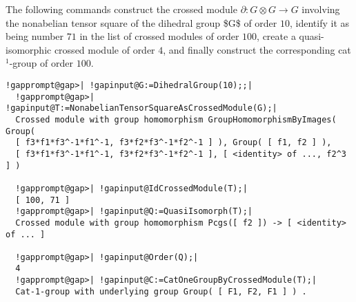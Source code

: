 \documentclass[a4paper,11pt]{report}
\begin{document}
{{The following commands construct the crossed module $\partial \colon G\otimes G \rightarrow G$ involving the nonabelian tensor square of the dihedral group \$G\$ of order $10$, identify it as being number $71$ in the list of crossed modules of order $100$, create a quasi-isomorphic crossed module of order $4$, and finally construct the corresponding cat$^1$-group of order $100$. 
\begin{Verbatim}[commandchars=!@|,fontsize=\small,frame=single,label=Example]
  !gapprompt@gap>| !gapinput@G:=DihedralGroup(10);;|
  !gapprompt@gap>| !gapinput@T:=NonabelianTensorSquareAsCrossedModule(G);|
  Crossed module with group homomorphism GroupHomomorphismByImages( Group( 
  [ f3*f1*f3^-1*f1^-1, f3*f2*f3^-1*f2^-1 ] ), Group( [ f1, f2 ] ), 
  [ f3*f1*f3^-1*f1^-1, f3*f2*f3^-1*f2^-1 ], [ <identity> of ..., f2^3 ] )
  
  !gapprompt@gap>| !gapinput@IdCrossedModule(T);|
  [ 100, 71 ]
  !gapprompt@gap>| !gapinput@Q:=QuasiIsomorph(T);|
  Crossed module with group homomorphism Pcgs([ f2 ]) -> [ <identity> of ... ]
  
  !gapprompt@gap>| !gapinput@Order(Q);|
  4
  !gapprompt@gap>| !gapinput@C:=CatOneGroupByCrossedModule(T);|
  Cat-1-group with underlying group Group( [ F1, F2, F1 ] ) . 
  
\end{Verbatim}
 }

 }

 
\end{document}
